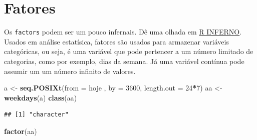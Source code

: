 \documentclass[]{book}
\newenvironment{Shaded}{\begin{snugshade}}{\end{snugshade}}
\newcommand{\KeywordTok}[1]{\textcolor[rgb]{0.13,0.29,0.53}{\textbf{#1}}}
\newcommand{\DataTypeTok}[1]{\textcolor[rgb]{0.13,0.29,0.53}{#1}}
\newcommand{\DecValTok}[1]{\textcolor[rgb]{0.00,0.00,0.81}{#1}}
\newcommand{\StringTok}[1]{\textcolor[rgb]{0.31,0.60,0.02}{#1}}
\newcommand{\OperatorTok}[1]{\textcolor[rgb]{0.81,0.36,0.00}{\textbf{#1}}}
\newcommand{\NormalTok}[1]{#1}
\theoremstyle{definition}
\theoremstyle{definition}
\theoremstyle{definition}
\theoremstyle{remark}
\begin{document}
\section{Fatores}\label{fatores}

Os \texttt{factors} podem ser um pouco infernais. Dê uma olhada em
\href{http://www.burns-stat.com/documents/books/the-r-inferno/}{R
INFERNO}.\\
Usados em análise estatísica, fatores são usados para armazenar
variáveis categóricas, ou seja, é uma variável que pode pertencer a um
número limitado de categorias, como por exemplo, dias da semana. Já uma
variável contínua pode assumir um um número infinito de valores.

\begin{Shaded}
\begin{Highlighting}[]
\NormalTok{a <-}\StringTok{ }\KeywordTok{seq.POSIXt}\NormalTok{(}\DataTypeTok{from =}\NormalTok{ hoje , }\DataTypeTok{by =} \DecValTok{3600}\NormalTok{, }\DataTypeTok{length.out =} \DecValTok{24}\OperatorTok{*}\DecValTok{7}\NormalTok{)}
\NormalTok{aa <-}\StringTok{ }\KeywordTok{weekdays}\NormalTok{(a)}
\KeywordTok{class}\NormalTok{(aa)}
\end{Highlighting}
\end{Shaded}

\begin{verbatim}
## [1] "character"
\end{verbatim}

\begin{Shaded}
\begin{Highlighting}[]
\KeywordTok{factor}\NormalTok{(aa)}
\end{Highlighting}
\end{Shaded}
\end{document}

